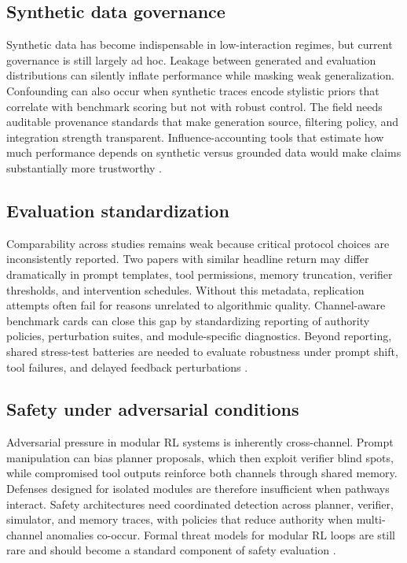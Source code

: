\documentclass[pdflatex,sn-mathphys-num]{sn-jnl}
\begin{document}
\subsection{Synthetic data governance}
Synthetic data has become indispensable in low-interaction regimes, but current governance is still largely ad hoc. Leakage between generated and evaluation distributions can silently inflate performance while masking weak generalization. Confounding can also occur when synthetic traces encode stylistic priors that correlate with benchmark scoring but not with robust control. The field needs auditable provenance standards that make generation source, filtering policy, and integration strength transparent. Influence-accounting tools that estimate how much performance depends on synthetic versus grounded data would make claims substantially more trustworthy \cite{arxiv_p_2310_20587,arxiv_p_2505_18098,arxiv_p_2601_08107,arxiv_p_2602_02137}.

\subsection{Evaluation standardization}
Comparability across studies remains weak because critical protocol choices are inconsistently reported. Two papers with similar headline return may differ dramatically in prompt templates, tool permissions, memory truncation, verifier thresholds, and intervention schedules. Without this metadata, replication attempts often fail for reasons unrelated to algorithmic quality. Channel-aware benchmark cards can close this gap by standardizing reporting of authority policies, perturbation suites, and module-specific diagnostics. Beyond reporting, shared stress-test batteries are needed to evaluate robustness under prompt shift, tool failures, and delayed feedback perturbations \cite{arxiv_p_2411_02337,doi_p_10_3390_app14198868,arxiv_p_2510_16720,arxiv_p_2601_12762}.

\subsection{Safety under adversarial conditions}
Adversarial pressure in modular RL systems is inherently cross-channel. Prompt manipulation can bias planner proposals, which then exploit verifier blind spots, while compromised tool outputs reinforce both channels through shared memory. Defenses designed for isolated modules are therefore insufficient when pathways interact. Safety architectures need coordinated detection across planner, verifier, simulator, and memory traces, with policies that reduce authority when multi-channel anomalies co-occur. Formal threat models for modular RL loops are still rare and should become a standard component of safety evaluation \cite{arxiv_p_2512_05686,arxiv_p_2602_09367,arxiv_p_2602_13156,arxiv_p_2602_11583}.
\end{document}
